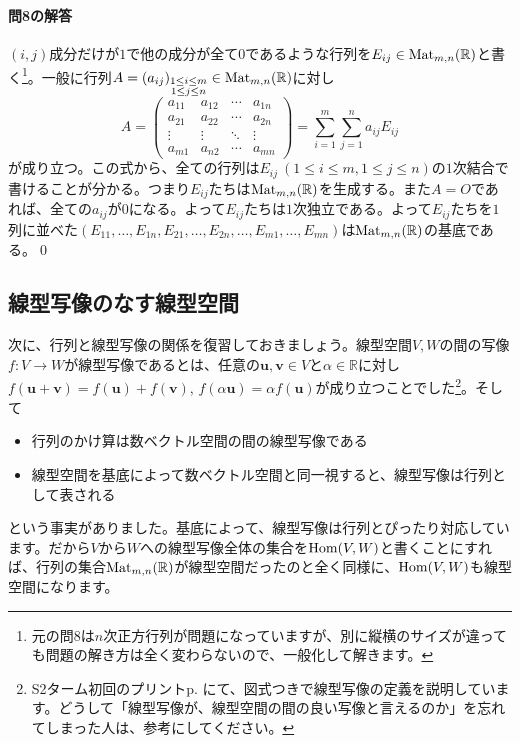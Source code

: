 \paragraph{問8の解答} $(i, j)$成分だけが$1$で他の成分が全て$0$であるような行列を$E_{ij} \in \operatorname{Mat}_{m, n}(\mathbb{R})$と書く\footnote{元の問8は$n$次正方行列が問題になっていますが、別に縦横のサイズが違っても問題の解き方は全く変わらないので、一般化して解きます。}。一般に行列$A = (a_{ij})_{\substack{1\leq i \leq m\\ 1\leq j\leq n}} \in \operatorname{Mat}_{m, n}(\mathbb{R})$に対し
\[
A=
\begin{pmatrix}
a_{11} & a_{12} & \cdots & a_{1n} \\
a_{21} & a_{22} & \cdots & a_{2n} \\
\vdots & \vdots & \ddots & \vdots \\
a_{m1} & a_{n2} & \cdots & a_{mn}
\end{pmatrix}
= 
\sum_{i = 1}^m \sum_{j = 1}^n a_{ij} E_{ij}
\]
が成り立つ。この式から、全ての行列は$E_{ij}\ (1\leq i\leq m, 1\leq j\leq n)$の$1$次結合で書けることが分かる。つまり$E_{ij}$たちは$\operatorname{Mat}_{m, n}(\mathbb{R})$を生成する。また$A = O$であれば、全ての$a_{ij}$が$0$になる。よって$E_{ij}$たちは$1$次独立である。よって$E_{ij}$たちを$1$列に並べた$(E_{11}, \ldots, E_{1n}, E_{21}, \ldots, E_{2n}, \ldots, E_{m1}, \ldots, E_{mn})$は$\operatorname{Mat}_{m, n}(\mathbb{R})$の基底である。\qed

\subsection{線型写像のなす線型空間}

次に、行列と線型写像の関係を復習しておきましょう。線型空間$V, W$の間の写像$f\colon V \rightarrow W$が線型写像であるとは、任意の$\bm{u}, \bm{v} \in V$と$\alpha \in \mathbb{R}$に対し$f(\bm{u} + \bm{v}) = f(\bm{u}) + f(\bm{v})$, $f(\alpha \bm{u}) = \alpha f(\bm{u})$が成り立つことでした\footnote{S2ターム初回のプリントp. \pageref{subsection:linear_map}にて、図式つきで線型写像の定義を説明しています。どうして「線型写像が、線型空間の間の良い写像と言えるのか」を忘れてしまった人は、参考にしてください。}。そして
\begin{itemize}
\item 行列のかけ算は数ベクトル空間の間の線型写像である
\item 線型空間を基底によって数ベクトル空間と同一視すると、線型写像は行列として表される
\end{itemize}
という事実がありました。基底によって、線型写像は行列とぴったり対応しています。だから$V$から$W$への線型写像全体の集合を$\operatorname{Hom}(V, W)$と書くことにすれば、行列の集合$\operatorname{Mat}_{m, n}(\mathbb{R})$が線型空間だったのと全く同様に、$\operatorname{Hom}(V, W)$も線型空間になります。


